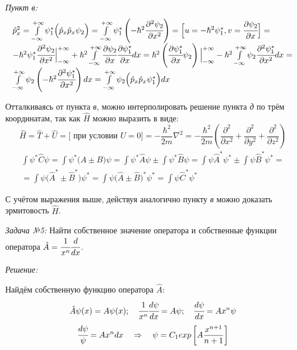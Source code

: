 \emph{Пункт в:}
\[
\begin{array}{ll}
	\hat{p}^2_x = \int\limits_{-\infty}^{+\infty} \psi_{1}^{*} \Big( \hat{p}_{x} 
		\hat{p}_{x} \psi_{2} \Big) = 
		\int\limits_{-\infty}^{+\infty} \psi_{1}^{*} \left( 
		-\hbar^{2} \cfrac{\partial^{2} \psi_{2}}{\partial x^2} \right) =
		\Big[ u = -\hbar^2 \psi_{1}^{*}, 
		v = \cfrac{\partial \psi_{2}}{\partial x} \Big] = \\
		-\hbar^{2} \psi_{1}^{*} \cfrac{\partial^{2} \psi_{2}}{\partial x^2} 
		\Big\vert_{-\infty}^{+\infty} + \hbar^{2} \int\limits_{-\infty}^{+\infty}
		\cfrac{\partial\psi_{2}}{\partial x}
		\cfrac{\partial\psi_{1}^{*}}{\partial x} dx =
		\hbar^{2}\left( 
		\cfrac{\partial\psi_{1}^{*}}{\partial x} \psi_{2}\right)
		\Big\vert_{-\infty}^{+\infty} -\hbar^{2} \int\limits_{-\infty}^{+\infty} 
		\psi_{2} \cfrac{\partial^{2}\psi_{1}^{*}}{\partial x^2} dx = \\
		\int\limits_{-\infty}^{+\infty} \psi_{2} 
		\left( -\hbar^{2} \cfrac{\partial^{2}\psi_{1}^{*}}{\partial x^2} \right)dx =
		\int\limits_{-\infty}^{+\infty} \psi_{2} 
		\Big( \hat{p}_{x} \hat{p}_{x} \psi_{1}^{*} \Big) dx 
\end{array}
\]

Отталкиваясь от пункта \emph{в}, можно интерполировать решение пункта \emph{д} по 
трём координатам, так как \( \hat{H} \) можно выразить в виде:
\[
	\hat{H} = \hat{T} + \hat{U} = \Big[ \text{ при условии } U = 0 \Big] = 
	-\frac{\hbar^2}{2m}\nabla^{2} = -\frac{\hbar^2}{2m}\left( 
	\frac{\partial^2}{\partial x^2} + \frac{\partial^2}{\partial y^2} + 
	\frac{\partial^2}{\partial z^2}\right)
\]
\[
\begin{array}{ll}
	\int \psi^{*} \hat{C} \psi = \int \psi^{*} \Big( A \pm B \Big) \psi = 
	\int \psi^{*} \hat{A} \psi \pm \int \psi^{*} \hat{B} \psi = 
	\int \psi \hat{A}^{*} \psi^{*} \pm \int \psi \hat{B}^{*} \psi^{*} = \\ =
	\int \psi \Big( \hat{A}^{*} \pm \hat{B}^{*} \Big) \psi^{*} = 
	\int \psi \Big( \hat{A} \pm \hat{B} \Big)^{*} \psi^{*} = 
	\int \psi \hat{C}^{*} \psi^{*}
\end{array}
\]

С учётом выражения выше, действуя аналогично пункту \emph{в} можно доказать 
эрмитовость \( \hat{H} \).

\pagebreak

\emph{Задача №5:} Найти собственное значение оператора и собственные функции 
оператора \( \hat{A} = \cfrac{1}{x^n}\cfrac{d}{dx} \).

\emph{Решение:}

Найдём собственную функцию оператора \( \hat{A} \):
\[
	\hat{A}\psi(x) = A\psi(x); \quad
	\cfrac{1}{x^n}\cfrac{d\psi}{dx} = A\psi; \quad
	\cfrac{d\psi}{dx} = A x^n \psi
\]
\[
	\cfrac{d\psi}{\psi} = A x^n dx \quad \Rightarrow \quad
	\psi = C_1 exp\left[ A \frac{x^{n+1}}{n+1} \right]
\]



